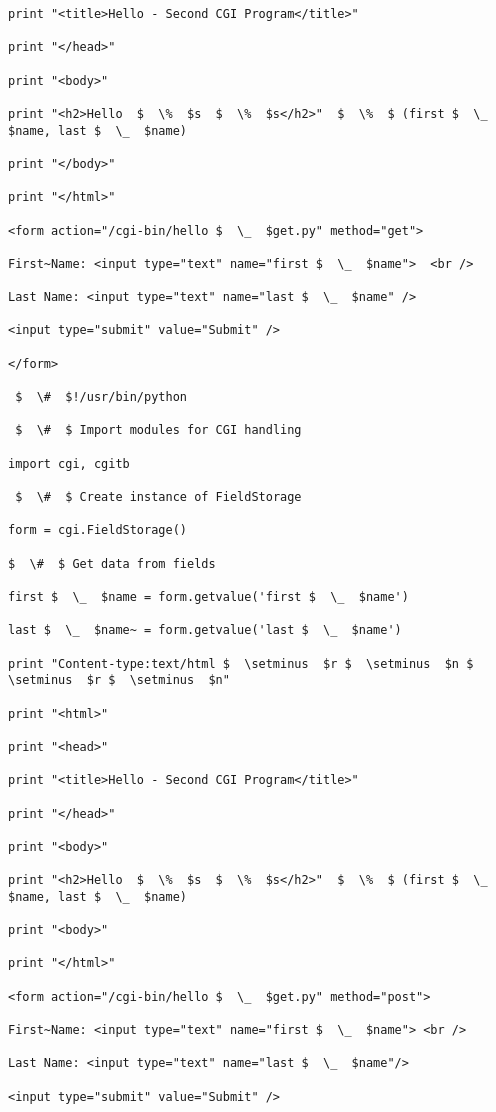 \begin {enumerate}
\begin {enumerate}
\begin{verbatim}
print "<title>Hello - Second CGI Program</title>"

print "</head>"

print "<body>"

print "<h2>Hello  $  \%  $s  $  \%  $s</h2>"  $  \%  $ (first $  \_  $name, last $  \_  $name)

print "</body>"

print "</html>"

<form action="/cgi-bin/hello $  \_  $get.py" method="get">

First~Name: <input type="text" name="first $  \_  $name">  <br />

Last Name: <input type="text" name="last $  \_  $name" />

<input type="submit" value="Submit" />

</form>

 $  \#  $!/usr/bin/python

 $  \#  $ Import modules for CGI handling

import cgi, cgitb

 $  \#  $ Create instance of FieldStorage

form = cgi.FieldStorage()

$  \#  $ Get data from fields

first $  \_  $name = form.getvalue('first $  \_  $name')

last $  \_  $name~ = form.getvalue('last $  \_  $name')

print "Content-type:text/html $  \setminus  $r $  \setminus  $n $  \setminus  $r $  \setminus  $n"

print "<html>"

print "<head>"

print "<title>Hello - Second CGI Program</title>"

print "</head>"

print "<body>"

print "<h2>Hello  $  \%  $s  $  \%  $s</h2>"  $  \%  $ (first $  \_  $name, last $  \_  $name)

print "<body>"

print "</html>"

<form action="/cgi-bin/hello $  \_  $get.py" method="post">

First~Name: <input type="text" name="first $  \_  $name"> <br />

Last Name: <input type="text" name="last $  \_  $name"/>

<input type="submit" value="Submit" />


\end{verbatim}
\end{enumerate}
\end{enumerate}
